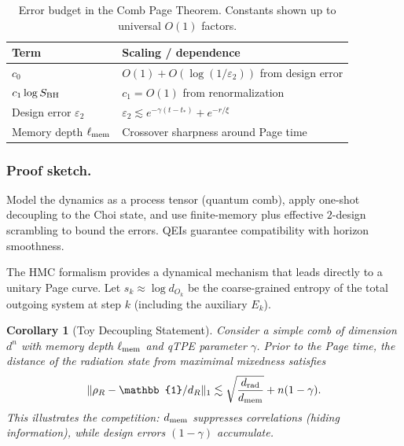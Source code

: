\documentclass[11pt,a4paper]{article}
\newcommand{\HMC}{\textsc{HMC}\xspace}
\theoremstyle{plain}
\newtheorem{corollary}[theorem]{Corollary}
\theoremstyle{definition}
\theoremstyle{remark}
\begin{document}
\begin{table}[hbtp]
\centering
\caption{Error budget in the Comb Page Theorem. Constants shown up to universal \(O(1)\) factors.}
\label{tab:error_budget}
\small
\begin{tabular*}{\textwidth}{@{\extracolsep{\fill}}ll@{}}
\toprule
\textbf{Term} & \textbf{Scaling / dependence} \\
\midrule
\(c_0\) & \(O(1) + O(\log(1/\varepsilon_2))\) from design error \\
\(c_1\log S_{\rm BH}\) & \(c_1=O(1)\) from renormalization \\
Design error \(\varepsilon_2\) & \(\varepsilon_2 \lesssim e^{-\gamma (t-t_\ast)} + e^{-r/\xi}\) \\
Memory depth \(\ell_{\rm mem}\) & Crossover sharpness around Page time \\
\bottomrule
\end{tabular*}
\end{table}

\subsubsection{Proof sketch.}
Model the dynamics as a process tensor (quantum comb), apply one-shot decoupling to the
Choi state, and use finite-memory plus effective \(2\)-design scrambling to bound the
errors.  QEIs guarantee compatibility with horizon smoothness.

The \HMC{} formalism provides a dynamical mechanism that leads directly to a unitary Page curve. Let $s_k \approx \log d_{O_k}$ be the coarse-grained entropy of the total outgoing system at step $k$ (including the auxiliary $E_k$).
%
\begin{corollary}[Toy Decoupling Statement]
Consider a simple comb of dimension $d^n$ with memory depth $\ell_{\rm mem}$ and qTPE parameter $\gamma$.
Prior to the Page time, the distance of the radiation state from maximimal mixedness satisfies
\[
\|\rho_{R} - \mathbb{1}/d_R\|_1 \lesssim \sqrt{\frac{d_{\rm rad}}{d_{\rm mem}}} + n(1-\gamma).
\]
This illustrates the competition: $d_{\rm mem}$ suppresses correlations (hiding information), while design errors $(1-\gamma)$ accumulate.
\end{corollary}
\end{document}
